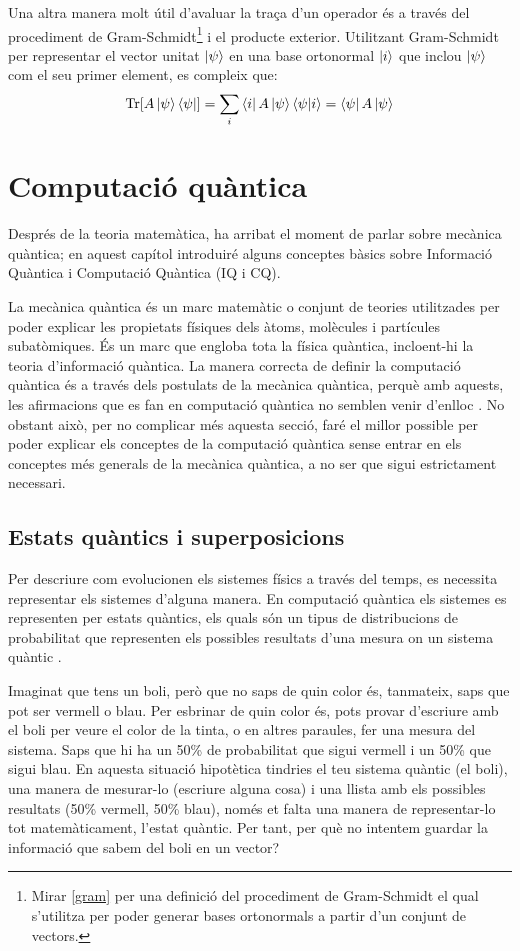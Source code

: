 Una altra manera molt útil d'avaluar la traça d'un operador és a través del procediment de Gram-Schmidt\footnote{Mirar \ref{gram} per una definició del procediment de Gram-Schmidt el qual s'utilitza per poder generar bases ortonormals a partir d'un conjunt de vectors.} i el producte exterior.
Utilitzant Gram-Schmidt per representar el vector unitat $\ket{\psi}$ en una base ortonormal $\ket{i}$ que inclou $\ket{\psi}$ com el seu primer element, es compleix que:
$$
\Tr[A\ket{\psi}\bra{\psi}] = \sum_i \bra{i}A\ket{\psi}\bra{\psi}\ket{i} = \bra{\psi}A\ket{\psi}
$$

\chapter{Computació quàntica}
Després de la teoria matemàtica, ha arribat el moment de parlar sobre mecànica quàntica; en aquest capítol introduiré alguns conceptes bàsics sobre Informació Quàntica i Computació Quàntica (IQ i CQ).

La mecànica quàntica és un marc matemàtic o conjunt de teories utilitzades per poder explicar les propietats físiques dels àtoms, molècules i partícules subatòmiques. És un marc que engloba tota la física quàntica, incloent-hi la teoria d'informació quàntica. La manera correcta de definir la computació quàntica és a través dels postulats de la mecànica quàntica, perquè amb aquests, les afirmacions que es fan en computació quàntica no semblen venir d'enlloc \cite{QCandQI:QM_postulates}. No obstant això, per no complicar més aquesta secció, faré el millor possible per poder explicar els conceptes de la computació quàntica sense entrar en els conceptes més generals de la mecànica quàntica, a no ser que sigui estrictament necessari.

\section{Estats quàntics i superposicions}
Per descriure com evolucionen els sistemes físics a través del temps, es necessita representar els sistemes d'alguna manera. En computació quàntica els sistemes es representen per estats quàntics, els quals són un tipus de distribucions de probabilitat que representen els possibles resultats d'una mesura on un sistema quàntic \cite{QT_concepts:q_systems}.

Imaginat que tens un boli, però que no saps de quin color és, tanmateix, saps que pot ser vermell o blau. Per esbrinar de quin color és, pots provar d'escriure amb el boli per veure el color de la tinta, o en altres paraules, fer una mesura del sistema. Saps que hi ha un 50\% de probabilitat que sigui vermell i un 50\% que sigui blau. En aquesta situació hipotètica tindries el teu sistema quàntic (el boli), una manera de mesurar-lo (escriure alguna cosa) i una llista amb els possibles resultats (50\% vermell, 50\% blau), només et falta una manera de representar-lo tot matemàticament, l'estat quàntic. Per tant, per què no intentem guardar la informació que sabem del boli en un vector?

